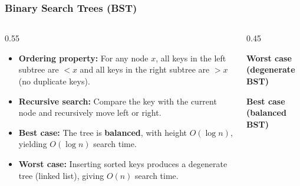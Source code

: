 \documentclass[8pt,aspectratio=169]{beamer}
\begin{document}
\begin{frame}[fragile]
\frametitle{Binary Search Trees (BST)}

\begin{columns}[T]

\begin{column}{0.55\textwidth}
\begin{itemize}
    \item \textbf{Ordering property:} For any node $x$, all keys in the left subtree are $< x$ and all keys in the right subtree are $> x$ (no duplicate keys).

    \item \textbf{Recursive search:} Compare the key with the current node and recursively move left or right.

    \item \textbf{Best case:} The tree is \textbf{balanced}, with height $O(\log n)$, yielding \textbf{$O(\log n)$} search time.

    \item \textbf{Worst case:} Inserting sorted keys produces a degenerate tree (linked list), giving \textbf{$O(n)$} search time.
\end{itemize}
\end{column}

\begin{column}{0.45\textwidth}

\centering
\textbf{Worst case (degenerate BST)}

\vspace{0.2cm}

\vspace{0.4cm}
\textbf{Best case (balanced BST)}


\end{column}
\end{columns}
\end{frame}
\end{document}
